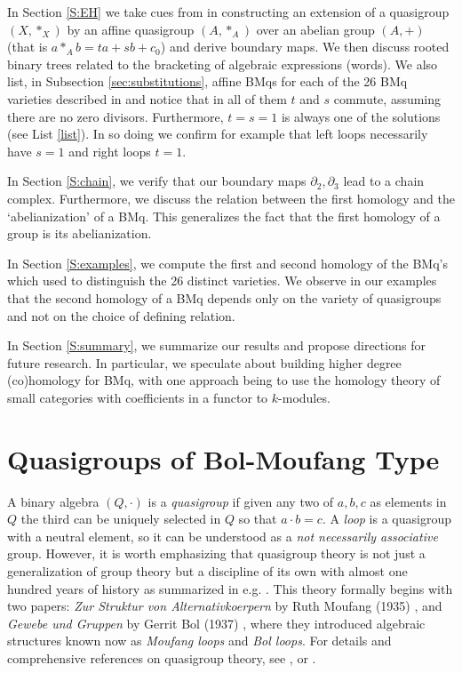 \documentclass[11pt]{amsart}
\theoremstyle{definition}
\begin{document}
In Section \ref{S:EH} we take cues from \cite{Eil} in constructing an extension of a quasigroup $(X,*_X)$ by an affine quasigroup $(A,*_A)$  over an abelian group $(A,+)$ (that is $a*_Ab=ta+sb+c_0$) and derive boundary maps. We then discuss rooted binary trees related to the bracketing of algebraic expressions (words). We also list, in Subsection  \ref{sec:substitutions}, affine BMqs for each of the 26 BMq varieties described in \cite{PhVo1} and notice that in all of them $t$ and $s$ commute, assuming there are no zero divisors. Furthermore, $t=s=1$ is always one of the solutions (see List \ref{list}). In so doing we confirm for example that left loops necessarily have $s=1$ and right loops $t=1$.


In Section \ref{S:chain}, we verify that our boundary maps $\partial_2, \partial_3$ lead to a chain complex. Furthermore, we discuss the relation between the first homology and the `abelianization' of a BMq. This generalizes the fact that the first homology of a group is its abelianization.

In Section \ref{S:examples}, we compute the first and second homology of the BMq's which \cite{PhVo1, PhVo2} used to distinguish the 26 distinct varieties. We observe in our examples that the second homology of a BMq depends only on the variety of quasigroups and not on the choice of defining relation.

In Section \ref{S:summary}, we summarize our results and propose directions for future research. In particular, we speculate about building higher degree (co)homology for BMq, with one approach being to use the homology theory of small categories with coefficients in a functor to $k$-modules. 


\section{Quasigroups of Bol-Moufang Type}\label{S:QBM} 

A binary algebra $(Q,\cdot)$ is a \emph{quasigroup} if given any two of $a,b,c$ as elements in $Q$ the third can be uniquely selected in $Q$ so that $a\cdot b=c$. A \emph{loop} is a quasigroup with a neutral element, so it can be understood as a \emph{not necessarily associative} group. However, it is worth emphasizing that quasigroup theory is not just a generalization of group theory but a discipline of its own with almost one hundred years of history as summarized in e.g. \cite{Pfl1}. This theory formally begins with two papers: \emph{Zur Struktur von Alternativkoerpern} by Ruth Moufang (1935) \cite{Mo}, and \emph{Gewebe und Gruppen} by Gerrit Bol (1937) \cite{Bo}, where they introduced algebraic structures known now as \emph{Moufang loops} and \emph{Bol loops}. For details and comprehensive references on quasigroup theory, see \cite{Pfl2}, \cite{Smi2} or \cite{Shch}.
\end{document}
